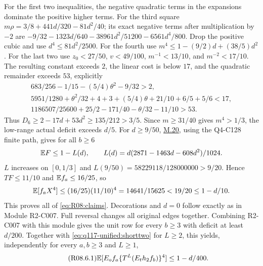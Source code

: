 For the first two inequalities, the negative quadratic terms in the
expansions dominate the positive higher terms. For the third square
$m\rho=3/8+441d/320-81d^2/40$; its exact negative terms after
multiplication by $-2$ are
$-9/32-1323d/640-38961d^2/51200-6561d^4/800$.
Drop the positive cubic and use $d^4\le81d^2/2500$.
For the fourth use $m^4\le1-(9/2)d+(38/5)d^2$.
For the last two use $z_0<27/50$, $v<49/100$,
$m^{-1}<13/10$, and $m^{-2}<17/10$.
The resulting constant exceeds $2$, the linear cost is below $17$,
and the quadratic remainder exceeds $53$, explicitly
\[
\begin{gathered}
683/256-1/15-(5/4)\theta^2-9/32>2,\\
5951/1280+\theta^2/32+4+3+(5/4)\theta+21/10+6/5+5/6<17,\\
1186507/25600+25/2-171/40-\theta/32-11/10>53.
\end{gathered}
\]
Thus $D_6\ge2-17d+53d^2\ge135/212>3/5$.
Since $m\ge31/40$ gives $m^4>1/3$, the low-range actual deficit
exceeds $d/5$.
For $d\ge9/50$, \hyperref[proof:Q5-C073-connectors]{M.20}, using the Q4-C128 finite path,
gives for all $b\ge6$
\[
\mathbb E F\le1-L(d),\qquad L(d)=d(2871-1463d-608d^2)/1024.
\]
$L$ increases on $[0,1/3]$ and
$L(9/50)=58229118/128000000>9/20$.
Hence $TF\le11/10$ and $\mathbb E f_a\le16/25$, so
\[
\mathbb E[f_aX^4]\le(16/25)(11/10)^4=14641/15625<19/20\le1-d/10.
\]
This proves all of \eqref{eq:R08:claims}.
Decorations and $d=0$ follow exactly as in Module R2-C007. Full reversal changes
all original edges together. Combining R2-C007 with this module gives
the unit row for every $b\ge3$ with deficit at least $d/200$.
Together with \eqref{eq:q117-unified:shorttwo} for $L\ge2$,
this yields, independently for
every $a,b\ge3$ and $L\ge1$,
\begin{equation}\tag{R08.6.1}\label{eq:R08:union}
\mathbb E[E_of_a\{T^L(E_th_2f_b)\}^4]\le1-d/400.
\end{equation}
